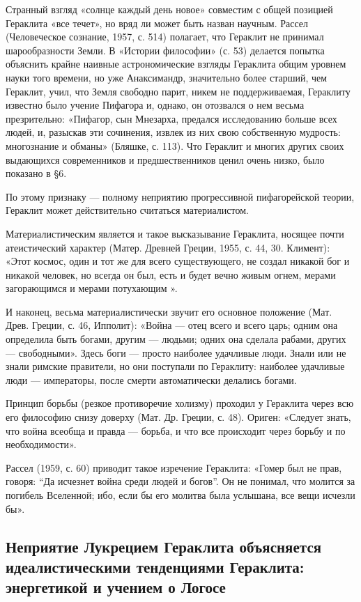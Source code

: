Странный взгляд «солнце каждый день новое» совместим с общей позицией
Гераклита «все течет», но вряд ли может быть назван научным. Рассел
(Человеческое сознание, 1957, с. 514) полагает, что Гераклит не
принимал шарообразности Земли. В «Истории философии» (с. 53) делается
попытка объяснить крайне наивные астрономические взгляды Гераклита
общим уровнем науки того времени, но уже Анаксимандр, значительно
более старший, чем Гераклит, учил, что Земля свободно парит, никем не
поддерживаемая, Гераклиту известно было учение Пифагора и, однако, он
отозвался о нем весьма презрительно: «Пифагор, сын Мнезарха, предался
исследованию больше всех людей, и, разыскав эти сочинения, извлек из
них свою собственную мудрость: многознание и обманы» (Бляшке, с. 113).
Что Гераклит и многих других своих выдающихся современников и
предшественников ценил очень низко, было показано в §6.

По этому признаку --- полному неприятию прогрессивной пифагорейской
теории, Гераклит может действительно считаться материалистом.

Материалистическим является и такое высказывание Гераклита, носящее
почти атеистический характер (Матер. Древней Греции, 1955, с. 44, 30.
Климент): «Этот космос, один и тот же для всего существующего, не
создал никакой бог и никакой человек, но всегда он был, есть и будет
вечно живым огнем, мерами загорающимся и мерами потухающим ».

И наконец, весьма материалистически звучит его основное положение
(Мат. Древ. Греции, с. 46, Ипполит): «Война --- отец всего и всего
царь; одним она определила быть богами, другим --- людьми; одних она
сделала рабами, других --- свободными». Здесь боги --- просто наиболее
удачливые люди. Знали или не знали римские правители, но они поступали
по Гераклиту: наиболее удачливые люди --- императоры, после смерти
автоматически делались богами.

Принцип борьбы (резкое противоречие холизму) проходил у Гераклита
через всю его философию снизу доверху (Мат. Др. Греции, с. 48).
Ориген: «Следует знать, что война всеобща и правда --- борьба, и что
все происходит через борьбу и по необходимости».

Рассел (1959, с. 60) приводит такое изречение Гераклита: «Гомер был не
прав, говоря: ``Да исчезнет война среди людей и богов''. Он не
понимал, что молится за погибель Вселенной; ибо, если бы его молитва
была услышана, все вещи исчезли бы».

\subsection{Неприятие Лукрецием Гераклита объясняется идеалистическими
тенденциями Гераклита: энергетикой и учением о Логосе}

